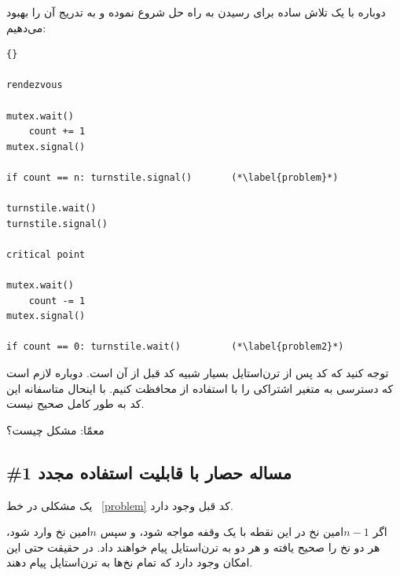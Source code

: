 \documentclass{book}
\newcommand{\clearemptydoublepage}{\newpage\cleardoublepage}
\begin{document}
    دوباره با یک تلاش ساده برای رسیدن به راه حل شروع نموده و به تدریج آن را بهبود می‌دهیم:

\begin{latin}
\begin{latin}
\begin{lstlisting}[title=\rl{{  نا راه حل حصار با قابلیت استفاده مجدد}}]{} 

rendezvous

mutex.wait()
    count += 1
mutex.signal()

if count == n: turnstile.signal()       (*\label{problem}*)

turnstile.wait()
turnstile.signal()

critical point

mutex.wait()
    count -= 1
mutex.signal()

if count == 0: turnstile.wait()         (*\label{problem2}*)
\end{lstlisting}
\end{latin}
\end{latin}

    توجه کنید که کد پس از تر‌ن‌استایل بسیار شبیه کد قبل از آن است. دوباره لازم است که دسترسی به متغیر اشتراکی  را 
    با استفاده از  محافظت کنیم. با اینحال متاسفانه این کد به طور کامل صحیح نیست. 

    معمّا: مشکل چیست؟


\clearemptydoublepage
\subsection { \#1 مساله حصار با قابلیت استفاده مجدد}

    یک مشکلی در خط ~\ref{problem} کد قبل وجود دارد. 

    اگر $n-1$امین نخ در این نقطه با یک وقفه مواجه شود، و سپس $n$امین نخ وارد  شود، هر دو نخ  
    را صحیح یافته و هر دو به ترن‌استایل پیام خواهند داد. در حقیقت حتی این امکان وجود دارد که تمام نخ‌ها به ترن‌استایل پیام دهند. 
\end{document}
